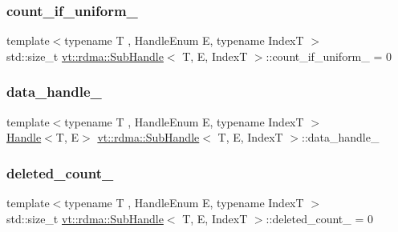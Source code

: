 \subsubsection{\texorpdfstring{count\+\_\+if\+\_\+uniform\+\_\+}{count\_if\_uniform\_}}
{\footnotesize\ttfamily template$<$typename T , Handle\+Enum E, typename IndexT $>$ \\
std\+::size\+\_\+t \hyperlink{structvt_1_1rdma_1_1_sub_handle}{vt\+::rdma\+::\+Sub\+Handle}$<$ T, E, IndexT $>$\+::count\+\_\+if\+\_\+uniform\+\_\+ = 0\hspace{0.3cm}{\ttfamily [protected]}}

\mbox{\label{structvt_1_1rdma_1_1_sub_handle_a9d6fa87336ed3a1f7e3167f1e44c07b2}} 
\subsubsection{\texorpdfstring{data\+\_\+handle\+\_\+}{data\_handle\_}}
{\footnotesize\ttfamily template$<$typename T , Handle\+Enum E, typename IndexT $>$ \\
\hyperlink{structvt_1_1rdma_1_1_handle}{Handle}$<$T, E$>$ \hyperlink{structvt_1_1rdma_1_1_sub_handle}{vt\+::rdma\+::\+Sub\+Handle}$<$ T, E, IndexT $>$\+::data\+\_\+handle\+\_\+\hspace{0.3cm}{\ttfamily [protected]}}

\mbox{\label{structvt_1_1rdma_1_1_sub_handle_af2147cd68e8f323bad1e63c83f529bfe}} 
\subsubsection{\texorpdfstring{deleted\+\_\+count\+\_\+}{deleted\_count\_}}
{\footnotesize\ttfamily template$<$typename T , Handle\+Enum E, typename IndexT $>$ \\
std\+::size\+\_\+t \hyperlink{structvt_1_1rdma_1_1_sub_handle}{vt\+::rdma\+::\+Sub\+Handle}$<$ T, E, IndexT $>$\+::deleted\+\_\+count\+\_\+ = 0\hspace{0.3cm}{\ttfamily [protected]}}

